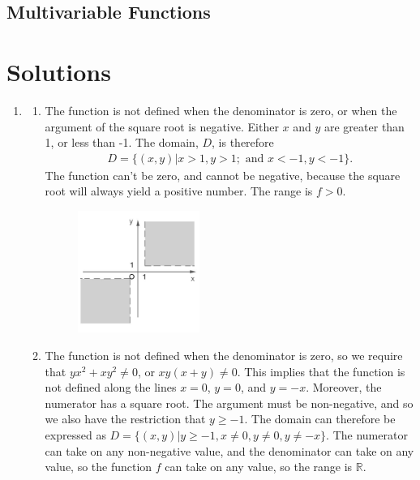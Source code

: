 \subsection{Multivariable Functions}

\newpage
\section*{Solutions}
\begin{enumerate}
\item 
\begin{enumerate}
\item The function is not defined when the denominator is zero, or when the argument of the square root is negative. Either $x$ and $y$ are greater than 1, or less than -1. The domain, $D$, is therefore
\begin{align*}D = \{(x,y)|x > 1, y > 1; \text{ and } x < -1, y < -1\}. \end{align*}
The function can't be zero, and cannot be negative, because the square root will always yield a positive number. The range is $f > 0$.  
\begin{figure}[!htbp]
  \begin{center}
    \includegraphics[width=0.4\textwidth]{Img1A.jpg}
  \end{center}
\end{figure}
\item The function is not defined when the denominator is zero, so we require that $yx^2+xy^2\ne0$, or $xy(x+y)\ne0$. This implies that the function is not defined along the lines $x=0$, $y=0$, and $y=-x$. Moreover, the numerator has a square root. The argument must be non-negative, and so we also have the restriction that $y\ge-1$. The domain can therefore be expressed as $D=\{(x,y)| y\ge -1, x\ne0, y\ne0, y\ne-x\}$. The numerator can take on any non-negative value, and the denominator can take on any value, so the function $f$ can take on any value, so the range is $\mathbb{R}$.

\end{enumerate}
\end{enumerate}
